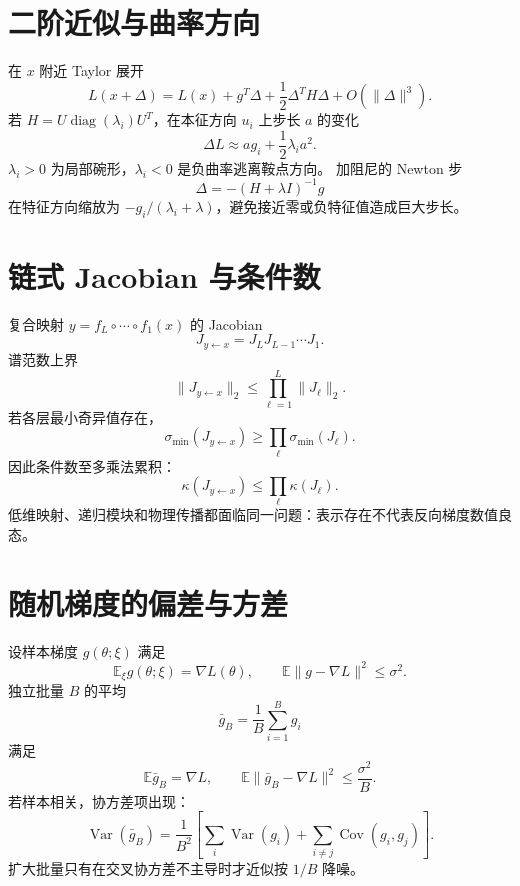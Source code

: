 \documentclass[11pt]{article}
\numberwithin{equation}{section}
\newcommand{\E}{\mathbb{E}}
\newcommand{\1}{\mathbf{1}}
\newcommand{\diag}{\operatorname{diag}}
\newcommand{\Var}{\operatorname{Var}}
\newcommand{\Cov}{\operatorname{Cov}}
\begin{document}
\section{二阶近似与曲率方向}

在 $x$ 附近 Taylor 展开
\begin{equation}
 L(x+\Delta)=L(x)+g^T\Delta
 +\frac12\Delta^TH\Delta+O(\|\Delta\|^3).
\end{equation}
若 $H=U\diag(\lambda_i)U^T$，在本征方向 $u_i$ 上步长 $a$ 的变化
\begin{equation}
 \Delta L\approx a g_i+\frac12\lambda_i a^2.
\end{equation}
$\lambda_i>0$ 为局部碗形，$\lambda_i<0$ 是负曲率逃离鞍点方向。
加阻尼的 Newton 步
\begin{equation}
 \Delta=-(H+\lambda I)^{-1}g
\end{equation}
在特征方向缩放为 $-g_i/(\lambda_i+\lambda)$，避免接近零或负特征值造成巨大步长。

\section{链式 Jacobian 与条件数}

复合映射 $y=f_L\circ\cdots\circ f_1(x)$ 的 Jacobian
\begin{equation}
 J_{y\leftarrow x}=J_LJ_{L-1}\cdots J_1.
\end{equation}
谱范数上界
\begin{equation}
 \|J_{y\leftarrow x}\|_2\le\prod_{\ell=1}^{L}\|J_\ell\|_2.
\end{equation}
若各层最小奇异值存在，
\begin{equation}
 \sigma_{\min}(J_{y\leftarrow x})
 \ge\prod_\ell\sigma_{\min}(J_\ell).
\end{equation}
因此条件数至多乘法累积：
\begin{equation}
 \kappa(J_{y\leftarrow x})
 \le\prod_\ell\kappa(J_\ell).
\end{equation}
低维映射、递归模块和物理传播都面临同一问题：表示存在不代表反向梯度数值良态。

\section{随机梯度的偏差与方差}

设样本梯度 $g(\theta;\xi)$ 满足
\begin{equation}
 \E_\xi g(\theta;\xi)=\nabla L(\theta),
 \qquad \E\|g-\nabla L\|^2\le\sigma^2.
\end{equation}
独立批量 $B$ 的平均
\begin{equation}
 \bar g_B=\frac1B\sum_{i=1}^{B}g_i
\end{equation}
满足
\begin{equation}
 \E\bar g_B=\nabla L,\qquad
 \E\|\bar g_B-\nabla L\|^2\le\frac{\sigma^2}{B}.
\end{equation}
若样本相关，协方差项出现：
\begin{equation}
 \Var(\bar g_B)=\frac1{B^2}\left[
 \sum_i\Var(g_i)+\sum_{i\ne j}\Cov(g_i,g_j)
 \right].
\end{equation}
扩大批量只有在交叉协方差不主导时才近似按 $1/B$ 降噪。
\end{document}
